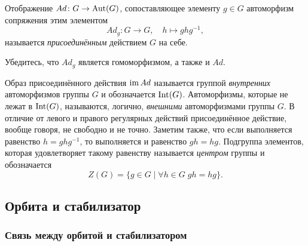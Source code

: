 \begin{example}
    Отображение $Ad \colon G \to \operatorname{Aut}(G)$, сопоставляющее элементу $g\in G$ автоморфизм сопряжения этим элементом \[Ad_g \colon G \to G, \quad h \mapsto ghg^{-1},\] называется \emph{присоединённым} действием $G$ на себе.

    \begin{practice}
        Убедитесь, что $Ad_g$ является гомоморфизмом, а также и $Ad$.
    \end{practice}

    Образ присоединённого действия $\operatorname{im} Ad$ называется группой \emph{внутренних} автоморфизмов группы $G$ и обозначается $\operatorname{Int}(G)$. Автоморфизмы, которые не лежат в $\operatorname{Int}(G)$, называются, логично, \emph{внешними} автоморфизмами группы $G$. В отличие от левого и правого регулярных действий присоединённое действие, вообще говоря, не свободно и не точно. Заметим также, что если выполняется равенство $h = ghg^{-1}$, то выполняется и равенство $gh = hg$. Подгруппа элементов, которая удовлетворяет такому равенству называется \emph{центром} группы и обозначается \[Z(G) = \{g \in G \mid \forall h \in G\; gh=hg\}.\]
\end{example}

\subsection{Орбита и стабилизатор}
\subsubsection{Связь между орбитой и стабилизатором}
                                                                                                                                                                                                              

